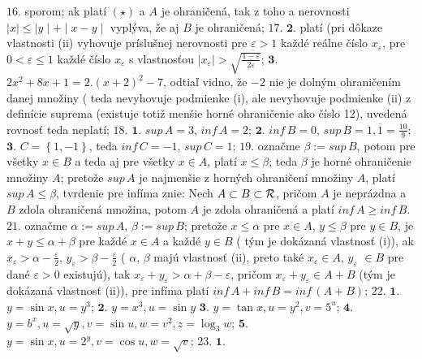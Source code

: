 $\boxed{16.}$ 
sporom; ak platí $ ( \star ) $ a $ A $ je ohraničená, tak z toho a nerovnosti $ \mid x \mid \leq  \mid y \mid + \mid x - y \mid $ vyplýva, že aj $ B $ je ohraničená;
$\boxed{17.}$
$\boldsymbol{2.}$
platí (pri dôkaze vlastnosti (ii) vyhovuje príslušnej nerovnosti pre $\varepsilon > 1$ každé reálne číslo $ x_{\varepsilon}  $, pre $ 0 < \varepsilon \leq  1 $ každé číslo  $ x_{\varepsilon}  $  s vlastnosťou $ \mid x_{\varepsilon} \mid > \sqrt{ \frac{1 - \varepsilon }{2 \varepsilon}} $;
$\boldsymbol{3.}$ $ 2x^{2}+8x+1=2.(x+2)^{2} -7 $, odtiaľ vidno, že $ -2 $ nie je dolným ohraničením danej množiny  ( teda nevyhovuje podmienke (i), ale nevyhovuje podmienke (ii) z definície  suprema (existuje totiž menšie horné ohraničenie ako číslo 12), uvedená rovnosť teda neplatí;
$\boxed{18.}$
$\boldsymbol{1.}$ $ sup \, A = 3 $, $ inf \, A = 2 $;
$\boldsymbol{2.}$ $ inf \, B = 0 $, $ sup \, B = 1,\overline{1} =\frac{10}{9} $;
$\boldsymbol{3.}$ $ C = \left\lbrace  1, -1 \right\rbrace  $, teda $ inf \, C = -1 $, $ sup \, C = 1 $;
$\boxed{19.}$
označme $ \beta := sup \, B $, potom pre všetky $ x \in B $ a teda aj pre všetky $ x \in A $, platí $ x \leq \beta $; teda $ \beta $ je horné ohraničenie množiny $ A $; pretože $ sup \, A $ je najmenšie z horných ohraničení množiny $ A $, platí $ sup \, A \leq \beta $, tvrdenie pre infíma znie: Nech $ A \subset B  \subset {\cal R}  $, pričom $ A $ je neprázdna a $ B $ zdola ohraničená množina, potom $ A $ je zdola ohraničená a platí $ inf \, A \geq inf  \, B $. 
$\boxed{21.}$ 
označme $ \alpha := sup \, A $,  $ \beta := sup \, B $; pretože $ x \leq \alpha $ pre $ x \in A $, $ y \leq \beta $ pre $ y \in B $, je $ x+y \leq \alpha + \beta $ pre každé $ x \in A $ a každé $ y \in B $ ( tým je dokázaná vlastnosť (i)), ak $ x_{\varepsilon } > \alpha - \frac{\varepsilon}{2} $,  $ y_{\varepsilon } > \beta - \frac{\varepsilon}{2} $   ( $ \alpha, \, \beta $ majú vlastnosť (ii), preto také $ x_{\varepsilon } \in A $, $ y_{ \varepsilon }$  $ \in B $ pre dané ${\varepsilon } > 0 $ existujú), tak $ x_{\varepsilon } + y_{\varepsilon } > \alpha + \beta - \varepsilon$, pričom $ x_{\varepsilon } + y_{\varepsilon } \in A + B $ (tým je dokázaná vlastnosť (ii)), pre infíma platí  $ inf \, A + inf \,B = inf \, ( A + B ) $; 
$\boxed{22.}$ 
$\boldsymbol{1.}$
$ y = \sin x , u=y^{3} $;
$\boldsymbol{2.}$ 
$ y = x^{3}, u= \sin y $
$\boldsymbol{3.}$ 
$ y = \tan x, u= y^{2}, v = 5^{u} $;
$\boldsymbol{4.}$ 
$ y = b^{x}, u= \sqrt{y}, v= \sin u, w = v^{2}, z = \log_{3} w $;
$\boldsymbol{5.}$ 
$ y = \sin x , u= 2^{y}, v= \cos u, w = \sqrt{v}$;
$\boxed{23.}$ 
$\boldsymbol{1.}$
